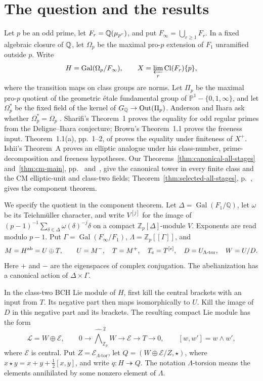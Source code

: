 \documentclass[11pt]{article}
\theoremstyle{definition}\newtheorem{definition}[theorem]{Definition}
\begin{document}
\section{The question and the results}
Let $p$ be an odd prime, let $F_r=\mathbb Q(\mu_{p^r})$, and put $F_\infty=\bigcup_{r\ge1}F_r$. In a fixed algebraic closure of $\mathbb Q$, let $\Omega_p$ be the maximal pro-$p$ extension of $F_1$ unramified outside $p$. Write
\[
 H=\operatorname{Gal}(\Omega_p/F_\infty),\qquad
 X=\varprojlim_r\operatorname{Cl}(F_r)\{p\},
\]
where the transition maps on class groups are norms. Let $\Pi_p$ be the maximal pro-$p$ quotient of the geometric \'etale fundamental group of $\mathbb P^1-\{0,1,\infty\}$, and let $\Omega_p^*$ be the fixed field of the kernel of $G_\mathbb Q\to\operatorname{Out}(\Pi_p)$.
Anderson and Ihara ask whether $\Omega_p^*=\Omega_p$ \cite[p.~272, question (a)]{AI}. Sharifi's Theorem~1 \cite[p.~2]{Sharifi} proves the equality for odd regular primes from the Deligne--Ihara conjecture; Brown's Theorem~1.1 \cite[p.~949]{Brown} proves the freeness input. Theorem~1.1(a), pp.~1--2, of \cite{Note} proves the equality under finiteness of $X^+$.
Ishii's Theorem~A \cite[p.~2; Theorem~2.14, p.~11]{Ishii} proves an elliptic analogue under his class-number, prime-decomposition and freeness hypotheses. Our Theorems~\ref{thm:canonical-all-stages} and~\ref{thm:cm-main}, pp.~\pageref{thm:canonical-all-stages} and~\pageref{thm:cm-main}, give the canonical tower in every finite class and the CM elliptic-unit and class-two fields; Theorem~\ref{thm:selected-all-stages}, p.~\pageref{thm:selected-all-stages}, gives the component theorem.

We specify the quotient in the component theorem. Let
$\Delta=\operatorname{Gal}(F_1/\mathbb Q)$, let $\omega$ be its
Teichm\"uller character, and write $V^{[j]}$ for the image of
$(p-1)^{-1}\sum_{\delta\in\Delta}\omega(\delta)^{-j}\delta$
on a compact $\mathbb Z_p[\Delta]$-module $V$. Exponents are
read modulo $p-1$. Put $\Gamma=\operatorname{Gal}(F_\infty/F_1)$,
$\Lambda=\mathbb Z_p[[\Gamma]]$, and
\[
 M=H^{\rm ab}=U\oplus T,\qquad U=M^-,\quad T=M^+,
 \quad T_e=T^{[e]},\quad D=U_{\Lambda\text{-tor}},\quad W=U/D.
\]
Here $+$ and $-$ are the eigenspaces of complex conjugation.
The abelianization has a canonical action of $\Delta\times\Gamma$.

In the class-two BCH Lie module of $H$, first kill the central
brackets with an input from $T$. Its negative part then maps
isomorphically to $U$. Kill the image of $D$ in this negative
part and its brackets. The resulting compact Lie module has the
form
\[
 \mathcal L=W\oplus\mathcal E,\qquad
 0\longrightarrow\widehat{\bigwedge}^{\,2}_{\mathbb Z_p}W
 \longrightarrow\mathcal E\longrightarrow T\longrightarrow0,
 \qquad [w,w']=w\wedge w',
\]
where $\mathcal E$ is central. Put $Z=\mathcal E_{\Lambda\text{-tor}}$, let
$Q=(W\oplus\mathcal E/Z,\star)$, where
$x\star y=x+y+\tfrac12[x,y]$, and write $q:H\twoheadrightarrow Q$.
The notation $\Lambda$-torsion means the elements annihilated
by some nonzero element of $\Lambda$.
\end{document}
